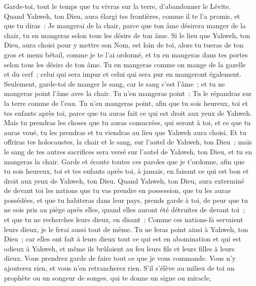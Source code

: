 \begin{multicols}{2}
Garde-toi, tout le temps que tu vivras sur la terre, d'abandonner le Lévite.
Quand Yahweh, ton Dieu, aura élargi tes frontières, comme il te l'a promis, et que tu diras~: Je mangerai de la chair, parce que ton âme désirera manger de la chair, tu en mangeras selon tous les désirs de ton âme.
Si le lieu que Yahweh, ton Dieu, aura choisi pour y mettre son Nom, est loin de toi, alors tu tueras de ton gros et menu bétail, comme je te l'ai ordonné, et tu en mangeras dans tes portes selon tous les désirs de ton âme.
Tu en mangeras comme on mange de la gazelle et du cerf~; celui qui sera impur et celui qui sera pur en mangeront également.
Seulement, garde-toi de manger le sang, car le sang c'est l'âme~; et tu ne mangeras point l'âme avec la chair.
Tu n'en mangeras point~: Tu le répandras sur la terre comme de l'eau.
Tu n'en mangeras point, afin que tu sois heureux, toi et tes enfants après toi, parce que tu auras fait ce qui est droit aux yeux de Yahweh.
Mais tu prendras les choses que tu auras consacrées, qui seront à toi, et ce que tu auras voué, tu les prendras et tu viendras au lieu que Yahweh aura choisi.
Et tu offriras tes holocaustes, la chair et le sang, sur l'autel de Yahweh, ton Dieu~; mais le sang de tes autres sacrifices sera versé sur l'autel de Yahweh, ton Dieu, et tu en mangeras la chair.
Garde et écoute toutes ces paroles que je t'ordonne, afin que tu sois heureux, toi et tes enfants après toi, à jamais, en faisant ce qui est bon et droit aux yeux de Yahweh, ton Dieu.
Quand Yahweh, ton Dieu, aura exterminé de devant toi les nations que tu vas prendre en possession, que tu les auras possédées, et que tu habiteras dans leur pays,
 prends garde à toi, de peur que tu ne sois pris au piège après elles, quand elles auront été détruites de devant toi~; et que tu ne recherches leurs dieux, en disant~: Comme ces nations-là servaient leurs dieux, je le ferai aussi tout de même.
Tu ne feras point ainsi à Yahweh, ton Dieu~; car elles ont fait à leurs dieux tout ce qui est en abomination et qui est odieux à Yahweh, et même ils brûlaient au feu leurs fils et leurs filles à leurs dieux.
Vous prendrez garde de faire tout ce que je vous commande. Vous n'y ajouterez rien, et vous n'en retrancherez rien.
\VerseOne{}S'il s'élève au milieu de toi un prophète ou un songeur de songes, qui te donne un signe ou miracle,

\end{multicols}
